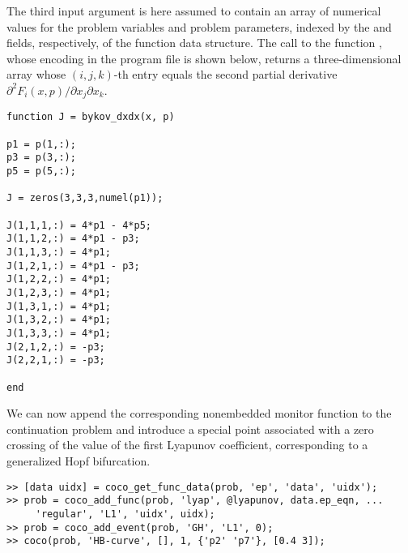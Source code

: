 The third input argument is here assumed to contain an array of numerical values for the problem variables and problem parameters, indexed by the  and  fields, respectively, of the function data structure. The call to the function , whose encoding in the program file  is shown below, returns a three-dimensional array whose $(i,j,k)$-th entry equals the second partial derivative $\partial^2 F_i(x,p)/\partial x_j\partial x_k$.

\begin{lstlisting}[language=coco-highlight]
function J = bykov_dxdx(x, p)

p1 = p(1,:);
p3 = p(3,:);
p5 = p(5,:);

J = zeros(3,3,3,numel(p1));

J(1,1,1,:) = 4*p1 - 4*p5;
J(1,1,2,:) = 4*p1 - p3;
J(1,1,3,:) = 4*p1;
J(1,2,1,:) = 4*p1 - p3;
J(1,2,2,:) = 4*p1;
J(1,2,3,:) = 4*p1;
J(1,3,1,:) = 4*p1;
J(1,3,2,:) = 4*p1;
J(1,3,3,:) = 4*p1;
J(2,1,2,:) = -p3;
J(2,2,1,:) = -p3;

end
\end{lstlisting}
We can now append the corresponding nonembedded monitor function to the continuation problem and introduce a special point associated with a zero crossing of the value of the first Lyapunov coefficient, corresponding to a generalized Hopf bifurcation.
\begin{lstlisting}[language=coco-highlight]
>> [data uidx] = coco_get_func_data(prob, 'ep', 'data', 'uidx');
>> prob = coco_add_func(prob, 'lyap', @lyapunov, data.ep_eqn, ...
     'regular', 'L1', 'uidx', uidx);
>> prob = coco_add_event(prob, 'GH', 'L1', 0);
>> coco(prob, 'HB-curve', [], 1, {'p2' 'p7'}, [0.4 3]);
\end{lstlisting}
\medskip

